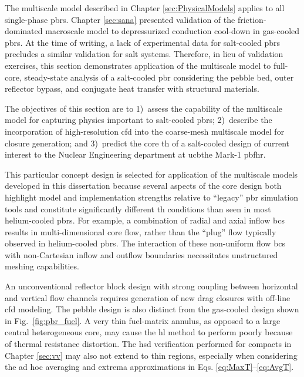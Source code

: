 The multiscale model described in Chapter \ref{sec:PhysicalModels} applies to all single-phase \glspl{pbr}. Chapter \ref{sec:sana} presented validation of the friction-dominated macroscale model to depressurized conduction cool-down in gas-cooled \glspl{pbr}. At the time of writing, a lack of experimental data for salt-cooled \glspl{pbr} precludes a similar validation for salt systems. Therefore, in lieu of validation exercises, this section demonstrates application of the multiscale model to full-core, steady-state analysis of a salt-cooled \gls{pbr} considering the pebble bed, outer reflector bypass, and conjugate heat transfer with structural materials. 

The objectives of this section are to 1)~assess the capability of the multiscale model for capturing physics important to salt-cooled \glspl{pbr}; 2)~describe the incorporation of high-resolution \gls{cfd} into the coarse-mesh multiscale model for closure generation; and 3)~predict the core \gls{th} of a salt-cooled design of current interest to the Nuclear Engineering department at \gls{ucb}\mdash the Mark-1 \gls{pbfhr}. 

This particular concept design is selected for application of the multiscale models developed in this dissertation because several aspects of the core design both highlight model and implementation strengths relative to ``legacy'' \gls{pbr} simulation tools and constitute significantly different \gls{th} conditions than seen in most helium-cooled \glspl{pbr}. For example, a combination of radial and axial inflow \glspl{bc} results in multi-dimensional core flow, rather than the ``plug'' flow typically observed in helium-cooled \glspl{pbr}. The interaction of these non-uniform flow \glspl{bc} with non-Cartesian inflow and outflow boundaries necessitates unstructured meshing capabilities. 

An unconventional reflector block design with strong coupling between horizontal and vertical flow channels requires generation of new drag closures with off-line \gls{cfd} modeling. The pebble design is also distinct from the gas-cooled design shown in Fig.\ \ref{fig:pbr_fuel}. A very thin fuel-matrix annulus, as opposed to a large central heterogeneous core, may cause the \gls{hl} method to perform poorly because of thermal resistance distortion. The \gls{hsd} verification performed for compacts in Chapter \ref{sec:vv} may also not extend to thin regions, especially when considering the ad hoc averaging and extrema approximations in Eqs. \eqref{eq:MaxT}--\eqref{eq:AvgT}.

